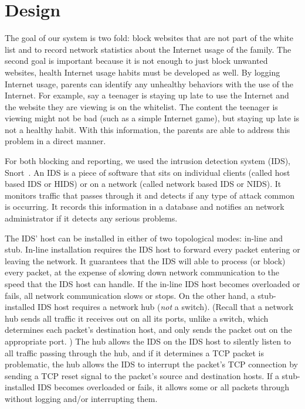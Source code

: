 
\section{Design}

The goal of our system is two fold: block websites that are not part of the
white list and to record network statistics about the Internet usage of the
family. The second goal is important because it is not enough to just block
unwanted websites, health Internet usage habits must be developed as well. By
logging Internet usage, parents can identify any unhealthy behaviors with the
use of the Internet. For example, say a teenager is staying up late to use the
Internet and the website they are viewing is on the whitelist. The content the
teenager is viewing might not be bad (such as a simple Internet game), but
staying up late is not a healthy habit. With this information, the parents are
able to address this problem in a direct manner.

For both blocking and reporting, we used the intrusion detection system (IDS),
Snort~\cite{snort}. An IDS is a piece of software that sits on individual
clients (called host based IDS or HIDS) or on a network (called network based
IDS or NIDS). It monitors traffic that passes through it and detects if any
type of attack common is occurring. It records this information in a database
and notifies an network administrator if it detects any serious problems.

The IDS' host can be installed in either of two topological modes: in-line and
stub.  
% 
In-line installation requires the IDS host to forward every packet entering or
leaving the network.  
%
It guarantees that the IDS will able to process (or block) every packet, at
the expense of slowing down network communication to the speed that the IDS
host can handle.  
%
If the in-line IDS host becomes overloaded or fails, all network communication slows
or stops.  
%
On the other hand, a stub-installed IDS host requires a network hub (\emph{not} a
switch).  
%
(Recall that a network hub sends all traffic it receives out on all its ports,
unlike a switch, which determines each packet's destination host, and only
sends the packet out on the appropriate port. ) 
%
The hub allows the IDS on the IDS host to silently listen to all traffic
passing through the hub, and if it determines a TCP packet is problematic, the
hub allows the IDS to interrupt the packet's TCP connection by sending a TCP
reset signal to the packet's source and destination hosts.
%
If a stub-installed IDS becomes overloaded or fails, it allows some or all
packets through without logging and/or interrupting them.

